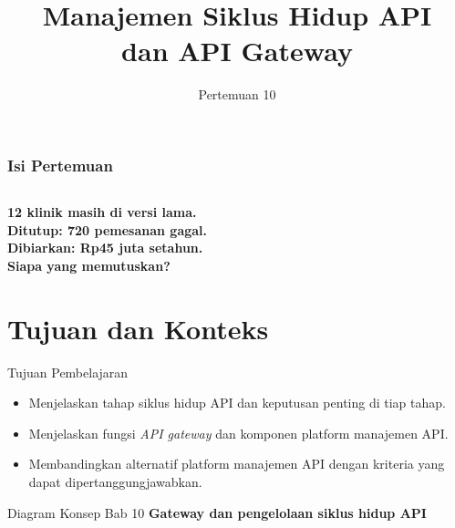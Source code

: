 \documentclass[aspectratio=169, table, 12pt]{beamer}
\title{\Huge Manajemen Siklus Hidup API\\ \vspace{10pt} dan API Gateway}
\date{Pertemuan 10}
\begin{document}
\frame{\titlepage}

\begin{frame}
  \frametitle{Isi Pertemuan}
  \vspace{14pt}
  \begin{columns}[t]
    {\small\tableofcontents[sections={1-5}]}

    {\small\tableofcontents[sections={6-10}]}
  \end{columns}
\end{frame}

\begin{frame}{\hfill}
  \centering
  \Huge{\textbf{12 klinik masih di versi lama.\\Ditutup: 720 pemesanan gagal.\\Dibiarkan: Rp45 juta setahun.\\Siapa yang memutuskan?}}
\end{frame}

\section{Tujuan dan Konteks}

\begin{frame}{{\Large Tujuan Pembelajaran}}
  \vspace{10pt}
  \begin{itemize}
    \item Menjelaskan tahap siklus hidup API dan keputusan penting di tiap tahap.
    \item Menjelaskan fungsi \textit{API gateway} dan komponen platform manajemen API.
    \item Membandingkan alternatif platform manajemen API dengan kriteria yang dapat dipertanggungjawabkan.
  \end{itemize}
\end{frame}

\begin{frame}{{\Large Diagram Konsep Bab 10}}
  \centering
  {\small\bfseries Gateway dan pengelolaan siklus hidup API}\par\medskip
\end{frame}
\end{document}
